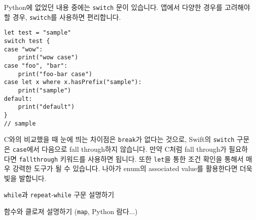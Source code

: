 \documentclass[../main.tex]{subfiles}
\begin{document}
Python에 없었던 내용 중에는 \texttt{switch} 문이 있습니다.
앱에서 다양한 경우를 고려해야 할 경우, \texttt{switch}를 사용하면 편리합니다.
\begin{verbatim}
let test = "sample"
switch test {
case "wow":
    print("wow case")
case "foo", "bar":
    print("foo-bar case")
case let x where x.hasPrefix("sample"):
    print("sample")
default:
    print("default")
}
// sample
\end{verbatim}
C와의 비교했을 때 눈에 띄는 차이점은 \texttt{break}가 없다는 것으로, Swift의
\texttt{switch} 구문은 \texttt{case}에서 다음으로 fall through하지 않습니다.
만약 C처럼 fall through가 필요하다면 \texttt{fallthrough} 키워드를 사용하면
됩니다.
또한 \texttt{let}을 통한 조건 확인을 통해서 매우 강력한 도구가 될 수 있습니다.
나아가 enum의 associated value를 활용한다면 더욱 빛을 발합니다.

\texttt{while}과 \texttt{repeat}-\texttt{while} 구문 설명하기

함수와 클로져 설명하기 (\texttt{map}, Python 람다...)
\end{document}
